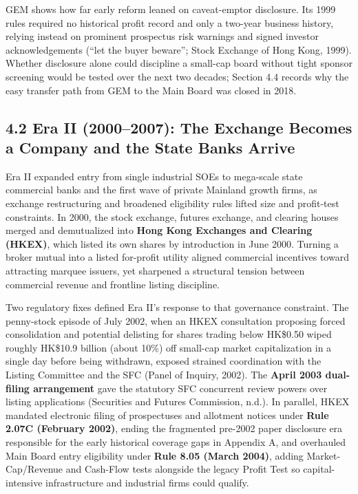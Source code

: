 \documentclass[11pt,letterpaper]{article}
\begin{document}
GEM shows how far early reform leaned on caveat-emptor disclosure. Its 1999 rules required no historical profit record and only a two-year business history, relying instead on prominent prospectus risk warnings and signed investor acknowledgements (``let the buyer beware''; Stock Exchange of Hong Kong, 1999). Whether disclosure alone could discipline a small-cap board without tight sponsor screening would be tested over the next two decades; Section 4.4 records why the easy transfer path from GEM to the Main Board was closed in 2018.

\subsection*{\texorpdfstring{4.2 Era II (2000–2007): The Exchange Becomes a Company and the State Banks Arrive}{4.2 Era II (2000–2007): The Exchange Becomes a Company and the State Banks Arrive}}
Era II expanded entry from single industrial SOEs to mega-scale state commercial banks and the first wave of private Mainland growth firms, as exchange restructuring and broadened eligibility rules lifted size and profit-test constraints. In 2000, the stock exchange, futures exchange, and clearing houses merged and demutualized into \textbf{Hong Kong Exchanges and Clearing (HKEX)}, which listed its own shares by introduction in June 2000. Turning a broker mutual into a listed for-profit utility aligned commercial incentives toward attracting marquee issuers, yet sharpened a structural tension between commercial revenue and frontline listing discipline.

Two regulatory fixes defined Era II's response to that governance constraint. The penny-stock episode of July 2002, when an HKEX consultation proposing forced consolidation and potential delisting for shares trading below HK\$0.50 wiped roughly HK\$10.9 billion (about 10\%) off small-cap market capitalization in a single day before being withdrawn, exposed strained coordination with the Listing Committee and the SFC (Panel of Inquiry, 2002). The \textbf{April 2003 dual-filing arrangement} gave the statutory SFC concurrent review powers over listing applications (Securities and Futures Commission, n.d.). In parallel, HKEX mandated electronic filing of prospectuses and allotment notices under \textbf{Rule 2.07C (February 2002)}, ending the fragmented pre-2002 paper disclosure era responsible for the early historical coverage gaps in Appendix A, and overhauled Main Board entry eligibility under \textbf{Rule 8.05 (March 2004)}, adding Market-Cap/Revenue and Cash-Flow tests alongside the legacy Profit Test so capital-intensive infrastructure and industrial firms could qualify.
\end{document}

